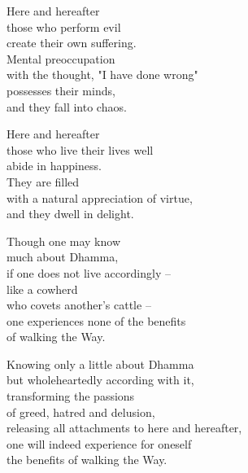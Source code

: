 Here and hereafter\\
those who perform evil\\
create their own suffering.\\
Mental preoccupation\\
with the thought, "I have done wrong"\\
possesses their minds,\\
and they fall into chaos.


Here and hereafter\\
those who live their lives well\\
abide in happiness.\\
They are filled\\
with a natural appreciation of virtue,\\
and they dwell in delight.


Though one may know\\
much about Dhamma,\\
if one does not live accordingly --\\
like a cowherd\\
who covets another's cattle --\\
one experiences none of the benefits\\
of walking the Way.


Knowing only a little about Dhamma\\
but wholeheartedly according with it,\\
transforming the passions\\
of greed, hatred and delusion,\\
releasing all attachments to here and hereafter,\\
one will indeed experience for oneself\\
the benefits of walking the Way.


